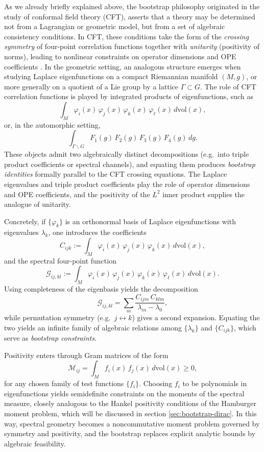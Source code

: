 \documentclass[11pt]{article}
\theoremstyle{plain}
\begin{document}
As we already briefly explained  above,  the bootstrap philosophy originated in the study of conformal field theory (CFT),
asserts that a theory may be determined not from a Lagrangian or geometric model,
but from a set of algebraic consistency conditions.  In CFT, these conditions take
the form of the \emph{crossing symmetry} of four-point correlation functions together
with \emph{unitarity} (positivity of norms), leading to nonlinear constraints on
operator dimensions and OPE coefficients \cite{BPZ1984,RRTV}.  In the geometric setting, an analogous structure emerges when studying Laplace
eigenfunctions on a compact Riemannian manifold $(M,g)$, or more generally on
a quotient of a Lie group by a lattice $\Gamma \subset G$.  The role of
CFT correlation functions is played by integrated products of eigenfunctions,
such as
\[
\int_M \varphi_i(x)\, \varphi_j(x)\, \varphi_k(x)\, \varphi_\ell(x)\, d\mathrm{vol}(x),
\]
or, in the automorphic setting,
\[
\int_{\Gamma \backslash G} F_1(g)\, F_2(g)\, F_3(g)\, F_4(g)\, dg.
\]
These objects admit two algebraically distinct decompositions (e.g.\ into
triple product coefficients or spectral channels), and equating them produces
\emph{bootstrap identities} formally parallel to the CFT crossing equations.
The Laplace eigenvalues and triple product coefficients play the role of operator
dimensions and OPE coefficients, and the positivity of the $L^2$ inner product
supplies the analogue of unitarity.  


\medskip

Concretely, if $\{\varphi_k\}$ is an orthonormal basis of Laplace eigenfunctions
with eigenvalues $\lambda_k$, one introduces the coefficients
\[
C_{ijk} := \int_M \varphi_i(x)\, \varphi_j(x)\, \varphi_k(x)\, d\mathrm{vol}(x),
\]
and the spectral four-point function
\[
\mathcal{G}_{ij,kl}
:= \int_M \varphi_i(x)\, \varphi_j(x)\, \varphi_k(x)\, \varphi_\ell(x)\, d\mathrm{vol}(x).
\]
Using completeness of the eigenbasis yields the decomposition
\[
\mathcal{G}_{ij,kl}
= \sum_{m} \frac{C_{ijm} \, C_{klm}}{\lambda_m - \lambda_0},
\]
while permutation symmetry (e.g.\ $j \leftrightarrow k$) gives a second expansion.
Equating the two yields an infinite family of algebraic relations among
$\{\lambda_k\}$ and $\{C_{ijk}\}$, which serve as \emph{bootstrap constraints}.

\medskip

Positivity enters through Gram matrices of the form
\[
\mathcal{M}_{ij} = \int_M f_i(x)\, f_j(x)\, d\mathrm{vol}(x) \ge 0,
\]
for any chosen family of test functions $\{f_i\}$.  Choosing $f_i$ to be
polynomials in eigenfunctions yields semidefinite constraints on the moments of
the spectral measure, closely analogous to the Hankel positivity conditions
of the Hamburger moment problem, which will be discussed in section \ref{sec:bootstrap-dirac}. 
In this way, spectral geometry becomes a noncommutative moment problem governed
by symmetry and positivity, and the bootstrap replaces explicit analytic bounds
by algebraic feasibility.
\end{document}
